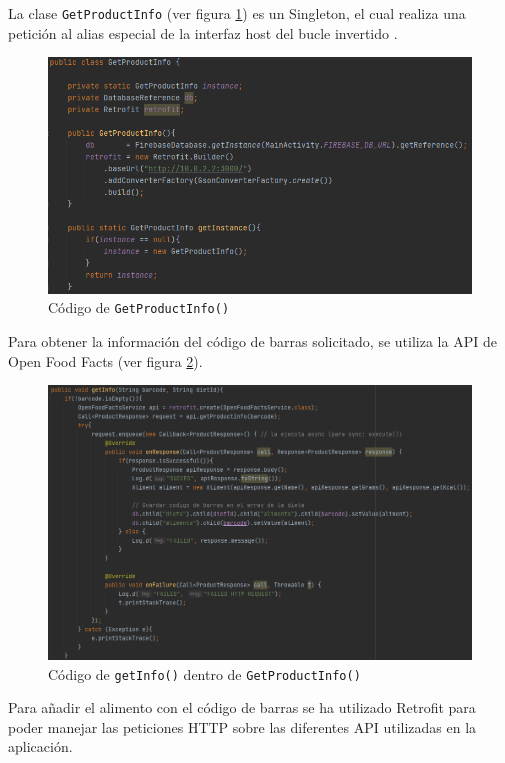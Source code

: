 La clase \texttt{GetProductInfo} (ver figura \ref{fig:productinfo}) es un Singleton, el cual realiza una petición al alias especial de la interfaz host del bucle invertido \cite{ip_emulator}.
\begin{figure}[H]
    \centering
    \includegraphics[width=\textwidth]{Images/Capitulo7/productinfo.png}
        \caption{Código de \texttt{GetProductInfo()}}
    \label{fig:productinfo}
\end{figure}
Para obtener la información del código de barras solicitado, se utiliza la API de Open Food Facts (ver figura \ref{fig:getinfo}).
\begin{figure}[H]
    \centering
    \includegraphics[width=\textwidth]{Images/Capitulo7/getinfo.png}
        \caption{Código de \texttt{getInfo()} dentro de \texttt{GetProductInfo()}}
    \label{fig:getinfo}
\end{figure}

Para añadir el alimento con el código de barras se ha utilizado Retrofit para poder manejar las peticiones HTTP sobre las diferentes API utilizadas en la aplicación.

